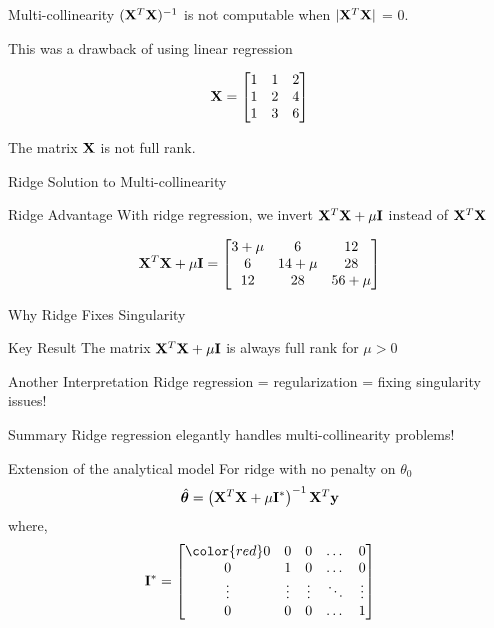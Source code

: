 \documentclass{beamer}
\begin{document}
\begin{frame}{Multi-collinearity}
$(\mathbf{X}^{T}\mathbf{X})^{-1}$ is not computable when $|\mathbf{X}^{T}\mathbf{X}|$ = 0.

This was a drawback of using linear regression

\begin{equation*}
\mathbf{X} = \begin{bmatrix}
1 & 1& 2\\
1 & 2& 4\\
1 & 3& 6\\
\end{bmatrix}
\end{equation*}

The matrix $\mathbf{X}$ is not full rank. 
\end{frame}

\begin{frame}{Ridge Solution to Multi-collinearity}
\begin{keypointsbox}{Ridge Advantage}
With ridge regression, we invert $\mathbf{X}^{T}\mathbf{X} + \mu \mathbf{I}$ instead of $\mathbf{X}^{T}\mathbf{X}$
\end{keypointsbox}

\begin{equation*}
\mathbf{X}^T\mathbf{X} + \mu \mathbf{I} = \begin{bmatrix}
3+\mu & 6& 12\\
6 & 14+\mu & 28\\
12 & 28& 56+\mu \\
\end{bmatrix}
\end{equation*}
\end{frame}

\begin{frame}{Why Ridge Fixes Singularity}
\begin{theorembox}{Key Result}
The matrix $\mathbf{X}^T\mathbf{X} + \mu \mathbf{I}$ is always full rank for $\mu > 0$
\end{theorembox}
\pause

\begin{alertbox}{Another Interpretation}
Ridge regression = regularization = fixing singularity issues!
\end{alertbox}
\pause

\begin{keypointsbox}{Summary}
Ridge regression elegantly handles multi-collinearity problems!
\end{keypointsbox}
\end{frame}


\begin{frame}{Extension of the analytical model}
For ridge with no penalty on $\theta_0$
$$
\hat{\boldsymbol{\theta}} = \left(\mathbf{X}^T\mathbf{X}+\mu \mathbf{I}^*\right)^{-1}\mathbf{X}^T\mathbf{y}
$$
where, $$\mI^* = \begin{bmatrix}
    \color{red}0 & 0 & 0 & \dots  & 0 \\
    0 & 1& 0 & \dots  & 0\\
    \vdots & \vdots & \vdots & \ddots & \vdots \\
    0 & 0 & 0 & \dots  & 1
\end{bmatrix}$$
\end{frame}
\end{document}
